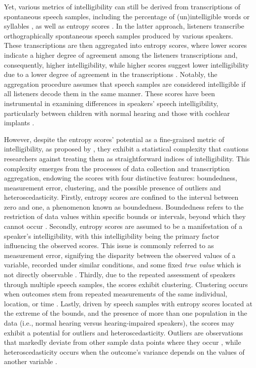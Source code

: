 \documentclass[
  authoryear,
  preprint,
  1p]{elsarticle}
\begin{document}
{Yet, various metrics of intelligibility can still be derived from
transcriptions of spontaneous speech samples, including the percentage
of (un)intelligible words or syllables
\citep{Flipsen_2006, Lagerberg_et_al_2014}, as well as entropy scores
\citep{Boonen_et_al_2023}. In the latter approach, listeners transcribe
orthographically spontaneous speech samples produced by various
speakers.} These transcriptions are then aggregated into entropy scores,
where lower scores indicate a higher degree of agreement among the
listeners transcriptions and, consequently, higher intelligibility,
while higher scores suggest lower intelligibility due to a lower degree
of agreement in the transcriptions
\citep{Boonen_et_al_2023, Faes_et_al_2022}. Notably, the aggregation
procedure assumes that speech samples are considered intelligible if all
listeners decode them in the same manner. These scores have been
instrumental in examining differences in speakers' speech
intelligibility, particularly between children with normal hearing and
those with cochlear implants \citep{Boonen_et_al_2023}.

However, despite the entropy scores' potential as a fine-grained metric
of intelligibility, as proposed by \citet{Boonen_et_al_2023}, they
exhibit a statistical complexity that cautions researchers against
treating them as straightforward indices of intelligibility. This
complexity emerges from the processes of data collection and
transcription aggregation, endowing the scores with four distinctive
features: boundedness, measurement error, clustering, and the possible
presence of outliers and heteroscedasticity. Firstly, entropy scores are
confined to the interval between zero and one, a phenomenon known as
boundedness. Boundedness refers to the restriction of data values within
specific bounds or intervals, beyond which they cannot occur
\citep{Lebl_2022}. {Secondly, entropy scores are assumed to be a
manifestation of a speaker's intelligibility, with this intelligibility
being the primary factor influencing the observed scores.} This issue is
commonly referred to as measurement error, signifying the disparity
between the observed values of a variable, recorded under similar
conditions, and some fixed \emph{true value} which is not directly
observable \citep{Everitt_et_al_2010}. Thirdly, due to the repeated
assessment of speakers through multiple speech samples, the scores
exhibit clustering. Clustering occurs when outcomes stem from repeated
measurements of the same individual, location, or time
\citep{McElreath_2020}. {Lastly, driven by speech samples with entropy
scores located at the extreme of the bounds, and the presence of more
than one population in the data (i.e., normal hearing versus
hearing-impaired speakers), the scores may exhibit a potential for
outliers and heteroscedasticity. Outliers are observations that markedly
deviate from other sample data points where they occur
\citep{Grubbs_1969}, while heteroscedasticity occurs when the outcome's
variance depends on the values of another variable
\citep{Everitt_et_al_2010}.}
\end{document}
